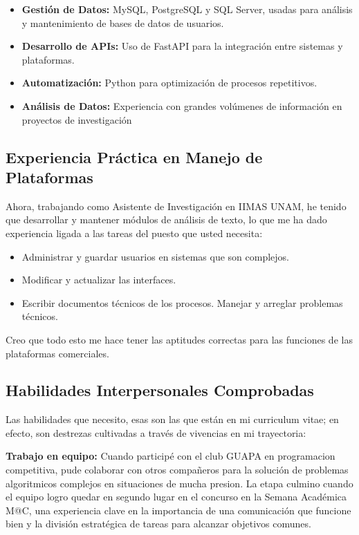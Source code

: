 \documentclass[letterpaper,11pt]{article}
\begin{document}
\begin{itemize}
\item \textbf{Gestión de Datos:} MySQL, PostgreSQL y SQL Server, usadas para análisis y mantenimiento de bases de datos de usuarios.
\item \textbf{Desarrollo de APIs:} Uso de FastAPI para la integración entre sistemas y plataformas.
\item \textbf{Automatización:} Python para optimización de procesos repetitivos.
\item \textbf{Análisis de Datos:} Experiencia con grandes volúmenes de información en proyectos de investigación
\end{itemize}

\subsection*{Experiencia Práctica en Manejo de Plataformas}
Ahora, trabajando como Asistente de Investigación en IIMAS UNAM, he tenido que desarrollar y mantener módulos de análisis de texto, lo que me ha dado experiencia ligada a las tareas del puesto que usted necesita:
\begin{itemize}
\item Administrar y guardar usuarios en sistemas que son complejos.
\item Modificar y actualizar las interfaces.
\item Escribir documentos técnicos de los procesos.
Manejar y arreglar problemas técnicos.
\end{itemize}

Creo que todo esto me hace tener las aptitudes correctas para las funciones de las plataformas comerciales.

\subsection*{Habilidades Interpersonales Comprobadas}
Las habilidades que necesito, esas son las que están en mi curriculum vitae; en efecto, son destrezas cultivadas a través de vivencias en mi trayectoria:

\textbf{Trabajo en equipo:} Cuando participé con el club GUAPA en programacion competitiva, pude colaborar con otros compañeros para la solución de problemas algoritmicos complejos en situaciones de mucha presion. La etapa culmino cuando el equipo logro quedar en segundo lugar en el concurso en la Semana Académica M@C, una experiencia clave en la importancia de una comunicación que funcione bien y la división estratégica de tareas para alcanzar objetivos comunes.
\end{document}
